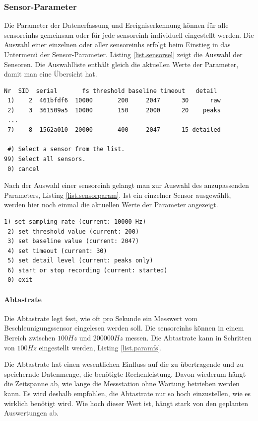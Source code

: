 \subsubsection{Sensor-Parameter}\label{sssec.sensorparam}
Die Parameter der Datenerfassung und Ereigniserkennung können für alle \glspl{sensoreinh} gemeinsam oder für jede \gls{sensoreinh} individuell eingestellt werden. Die Auswahl einer einzelnen oder aller \glspl{sensoreinh} erfolgt beim Einstieg in das Untermenü der Sensor-Parameter. Listing \ref{list.sensorsel} zeigt die Auswahl der Sensoren. Die Auswahlliste enthält gleich die aktuellen Werte der Parameter, damit man eine Übersicht hat.


\begin{lstlisting}[caption=Untermenü Sensor-Auswahl, label=list.sensorsel]
 Nr  SID  serial       fs threshold baseline timeout   detail
 1)    2  461bfdf6  10000       200     2047      30      raw
 2)    3  361509a5  10000       150     2000      20    peaks
 ...
 7)    8  1562a010  20000       400     2047      15 detailed
 
 #) Select a sensor from the list.
99) Select all sensors.
 0) cancel
\end{lstlisting}

Nach der Auswahl einer \gls{sensoreinh} gelangt man zur Auswahl des anzupassenden Parameters, Listing \ref{list.sensorparam}. Ist ein einzelner Sensor ausgewählt, werden hier noch einmal die aktuellen Werte der Parameter angezeigt.

\begin{lstlisting}[caption=Untermenü Sensor-Parameter, label=list.sensorparam]
 1) set sampling rate (current: 10000 Hz)
 2) set threshold value (current: 200)
 3) set baseline value (current: 2047)
 4) set timeout (current: 30)
 5) set detail level (current: peaks only)
 6) start or stop recording (current: started)
 0) exit
\end{lstlisting}

\paragraph{Abtastrate} Die Abtastrate legt fest, wie oft pro Sekunde ein Messwert vom Beschleunigungssensor eingelesen werden soll. Die \glspl{sensoreinh} können in einem Bereich zwischen \ensuremath{100 Hz} und \ensuremath{200000 Hz} messen. Die Abtastrate kann in Schritten von \ensuremath{100 Hz} eingestellt werden, Listing \ref{list.paramfs}.

Die Abtastrate hat einen wesentlichen Einfluss auf die zu übertragende und zu speichernde Datenmenge, die benötigte Rechenleistung. Davon wiederum hängt die Zeitspanne ab, wie lange die Messstation ohne Wartung betrieben werden kann. Es wird deshalb empfohlen, die Abtastrate nur so hoch einzustellen, wie es wirklich benötigt wird. Wie hoch dieser Wert ist, hängt stark von den geplanten Auswertungen ab.

